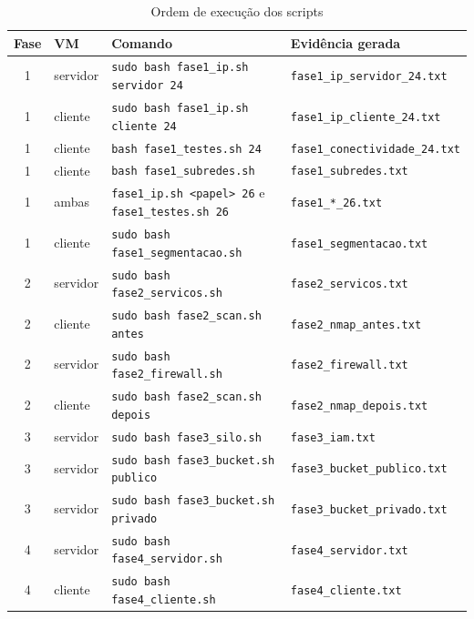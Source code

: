 \begin{table}[htbp]
  \centering
  \caption{Ordem de execução dos scripts}\label{tab:roteiro}
  \footnotesize
  \begin{tabular}{clll}
    \hline
    \textbf{Fase} & \textbf{VM} & \textbf{Comando} & \textbf{Evidência gerada} \\
    \hline
    1 & servidor & \texttt{sudo bash fase1\_ip.sh servidor 24}  & \texttt{fase1\_ip\_servidor\_24.txt} \\
    1 & cliente  & \texttt{sudo bash fase1\_ip.sh cliente 24}   & \texttt{fase1\_ip\_cliente\_24.txt} \\
    1 & cliente  & \texttt{bash fase1\_testes.sh 24}            & \texttt{fase1\_conectividade\_24.txt} \\
    1 & cliente  & \texttt{bash fase1\_subredes.sh}             & \texttt{fase1\_subredes.txt} \\
    1 & ambas    & \texttt{fase1\_ip.sh <papel> 26} e \texttt{fase1\_testes.sh 26} & \texttt{fase1\_*\_26.txt} \\
    1 & cliente  & \texttt{sudo bash fase1\_segmentacao.sh}     & \texttt{fase1\_segmentacao.txt} \\
    2 & servidor & \texttt{sudo bash fase2\_servicos.sh}        & \texttt{fase2\_servicos.txt} \\
    2 & cliente  & \texttt{sudo bash fase2\_scan.sh antes}      & \texttt{fase2\_nmap\_antes.txt} \\
    2 & servidor & \texttt{sudo bash fase2\_firewall.sh}        & \texttt{fase2\_firewall.txt} \\
    2 & cliente  & \texttt{sudo bash fase2\_scan.sh depois}     & \texttt{fase2\_nmap\_depois.txt} \\
    3 & servidor & \texttt{sudo bash fase3\_silo.sh}            & \texttt{fase3\_iam.txt} \\
    3 & servidor & \texttt{sudo bash fase3\_bucket.sh publico}  & \texttt{fase3\_bucket\_publico.txt} \\
    3 & servidor & \texttt{sudo bash fase3\_bucket.sh privado}  & \texttt{fase3\_bucket\_privado.txt} \\
    4 & servidor & \texttt{sudo bash fase4\_servidor.sh}        & \texttt{fase4\_servidor.txt} \\
    4 & cliente  & \texttt{sudo bash fase4\_cliente.sh}         & \texttt{fase4\_cliente.txt} \\
    \hline
  \end{tabular}
\end{table}

